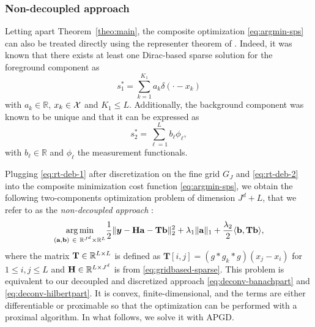 \documentclass[12pt]{article}
\begin{document}
        \subsubsection{Non-decoupled approach}
        Letting apart Theorem~\ref{theo:main}, the composite optimization \eqref{eq:argmin-sps} can also be treated directly using the representer theorem of \cite{debarre2021continuous}. Indeed, it was known that there exists at least one Dirac-based sparse solution for the foreground component as
        \begin{equation}
            s_1^* = \sum_{k=1}^{K_1} a_{k} \delta(\cdot - x_k)
            \label{eq:rt-deb-1}
        \end{equation}
        with $a_{k} \in \mathbb{R}$, $x_k \in \mathcal{X}$ and $K_1 \leq L$.
        Additionally, the background component was known to be unique and that it can be expressed as
        \begin{equation}
            s_2^* = \sum_{\ell=1}^{L} b_{\ell} \phi_\ell,
            \label{eq:rt-deb-2}
        \end{equation}
        with $b_\ell \in \mathbb{R}$ and $\phi_\ell$ the measurement functionals.

        Plugging \eqref{eq:rt-deb-1} after discretization on the fine grid $G_J$ and \eqref{eq:rt-deb-2} into the composite minimization cost function \eqref{eq:argmin-sps}, we obtain the following two-components optimization problem of dimension $J^d + L$, that we refer to as the \emph{non-decoupled approach} :
        \begin{equation}
        \label{eq:ndcp-argmin}
            \underset{(\mathbf{a}, \mathbf{b})\ \in\ \mathbb{R}^{J^d} \times \mathbb{R}^L}{\arg\min} \frac{1}{2} \| \bm{y} - \mathbf{Ha} - \mathbf{Tb} \|_2^2  + \lambda_{1} \| \mathbf{a} \|_1 + \frac{\lambda_{2}}{2} \langle \mathbf{b}, \mathbf{Tb} \rangle,
        \end{equation}
        where the matrix $\mathbf{T} \in \mathbb{R}^{L \times L}$ is defined as
        $\mathbf{T}[i, j] = (g * g_k * g)(x_j - x_i)$ for $1 \leq i, j \leq L$
        and $\mathbf{H} \in \mathbb{R}^{L\times J^d}$ is from \eqref{eq:gridbased-sparse}.
        This problem is equivalent to our decoupled and discretized approach \eqref{eq:deconv-banachpart} and \eqref{eq:deconv-hilbertpart}. It is convex, finite-dimensional, and the terms are either differentiable or proximable so that the optimization can be performed with a proximal algorithm. In what follows, we solve it with APGD. %
    
\end{document}
